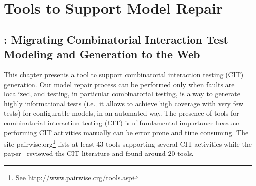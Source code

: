 \begin{tikzborder}{\cite{Gargantini16:validation}}
\begin{tikzborder}{\cite{gargantini_combinatorial_2017}}
\begin{tikzborder}{\cite{garn2019}}
\begin{tikzborder}{\cite{arcaini2019achieving}}

\part{Tools to Support Model Repair}
\chapter{\ctwedge: Migrating Combinatorial Interaction Test Modeling and Generation to the Web}\label{ch:ctwedge}
This chapter presents a tool to support combinatorial interaction testing (CIT) generation. Our model repair process can be performed only when faults are localized, and testing, in particular combinatorial testing, is a way to generate highly informational tests (i.e., it allows to achieve high coverage with very few tests) for configurable models, in an automated way.
The presence of tools for combinatorial interaction testing (CIT) is of fundamental importance because performing CIT activities manually can be error prone and time consuming. 
The site pairwise.org\footnote{See \url{http://www.pairwise.org/tools.asp}} lists at least 43 tools supporting several CIT activities while the paper~\cite{NieL11} reviewed the CIT literature and found around 20 tools. 


\end{tikzborder}
\end{tikzborder}
\end{tikzborder}
\end{tikzborder}
